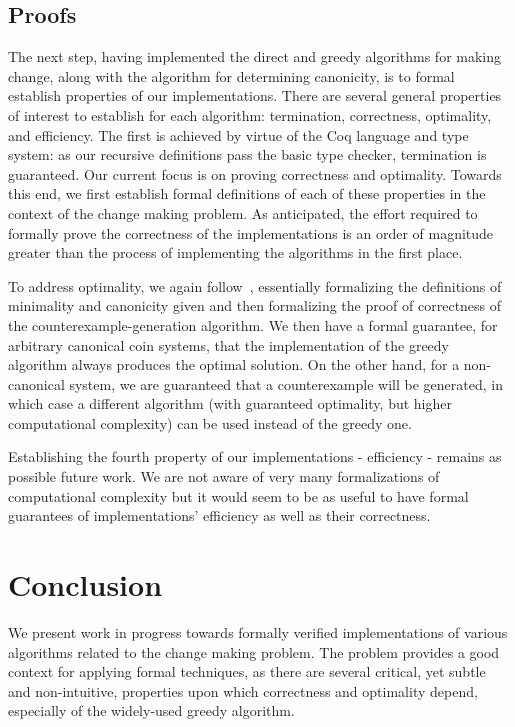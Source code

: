 \documentclass{acm_proc_article-sp}
\begin{document}
\subsection{Proofs}

The next step, having implemented the direct and greedy algorithms for making change, along with the algorithm for determining canonicity, is to formal establish properties of our implementations. There are several general properties of interest to establish for each algorithm: termination, correctness, optimality, and efficiency. The first is achieved by virtue of the Coq language and type system: as our recursive definitions pass the basic type checker, termination is guaranteed. Our current focus is on proving correctness and optimality. Towards this end, we first establish formal definitions of each of these properties in the context of the change making problem. As anticipated, the effort required to formally prove the correctness of the implementations  is  an order of magnitude greater than the process of implementing the algorithms in the first place. 

To address optimality, we again follow~\cite{pearson94}, essentially formalizing the definitions of minimality and canonicity given and then formalizing the proof of correctness of the counterexample-generation algorithm. We then have a formal guarantee, for arbitrary canonical coin systems, that the implementation of the greedy algorithm always produces the optimal solution. On the other hand, for a non-canonical system, we are guaranteed that a counterexample will be generated, in which case a different algorithm (with guaranteed optimality, but higher computational complexity) can be used instead of the greedy one.

Establishing the fourth property of our implementations - efficiency - remains as possible future work. We are not aware of very many formalizations of computational complexity but it would seem to be as useful to have formal guarantees of  implementations' efficiency as well as their correctness.


\section{Conclusion}

We present work in progress towards formally verified implementations of various algorithms related to the change making problem. The problem provides a good context for applying formal techniques, as there are several critical, yet subtle and non-intuitive, properties upon which correctness and optimality depend, especially of the widely-used greedy algorithm.




\end{document}
